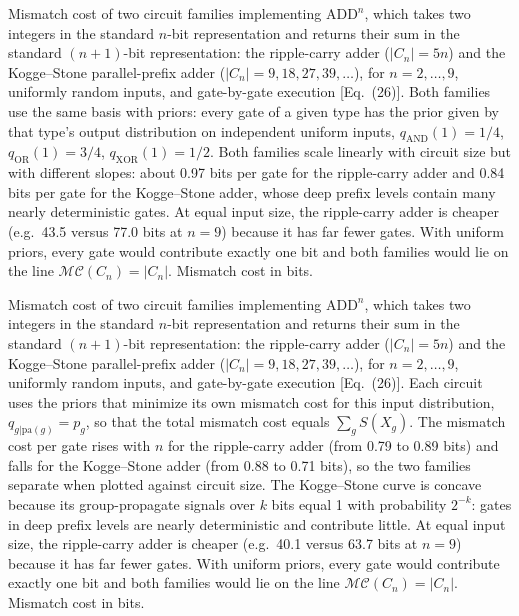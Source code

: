 \caption{Mismatch cost of two circuit families implementing $\mathrm{ADD}^n$, which takes
two integers in the standard $n$-bit representation and returns their sum in the
standard $(n+1)$-bit representation: the ripple-carry adder ($|C_n| = 5n$) and the
Kogge--Stone parallel-prefix adder ($|C_n| = 9, 18, 27, 39, \dots$), for
$n = 2,\dots,9$, uniformly random inputs, and gate-by-gate execution [Eq.~(26)]. Both
families use the same basis with priors: every gate of a given type has the prior given
by that type's output distribution on independent uniform inputs,
$q_{\mathrm{AND}}(1) = 1/4$, $q_{\mathrm{OR}}(1) = 3/4$, $q_{\mathrm{XOR}}(1) = 1/2$.
Both families scale linearly with circuit size but with different slopes: about
0.97 bits per gate for the ripple-carry adder and 0.84 bits per gate for the
Kogge--Stone adder, whose deep prefix levels contain many nearly deterministic gates. At
equal input size, the ripple-carry adder is cheaper (e.g.\ 43.5 versus 77.0 bits at
$n = 9$) because it has far fewer gates. With uniform priors, every gate would
contribute exactly one bit and both families would lie on the line
$\mathcal{MC}(C_n) = |C_n|$. Mismatch cost in bits.}

\caption{Mismatch cost of two circuit families implementing $\mathrm{ADD}^n$, which takes
two integers in the standard $n$-bit representation and returns their sum in the
standard $(n+1)$-bit representation: the ripple-carry adder ($|C_n| = 5n$) and the
Kogge--Stone parallel-prefix adder ($|C_n| = 9, 18, 27, 39, \dots$), for
$n = 2,\dots,9$, uniformly random inputs, and gate-by-gate execution [Eq.~(26)]. Each
circuit uses the priors that minimize its own mismatch cost for this input
distribution, $q_{g|\mathrm{pa}(g)} = p_g$, so that the total mismatch cost equals
$\sum_g S(X_g)$. The mismatch cost per gate rises with $n$ for the ripple-carry adder
(from 0.79 to 0.89 bits) and falls for the Kogge--Stone adder (from 0.88 to 0.71 bits),
so the two families separate when plotted against circuit size. The Kogge--Stone curve
is concave because its group-propagate signals over $k$ bits equal 1 with probability
$2^{-k}$: gates in deep prefix levels are nearly deterministic and contribute little. At
equal input size, the ripple-carry adder is cheaper (e.g.\ 40.1 versus 63.7 bits at
$n = 9$) because it has far fewer gates. With uniform priors, every gate would
contribute exactly one bit and both families would lie on the line
$\mathcal{MC}(C_n) = |C_n|$. Mismatch cost in bits.}

